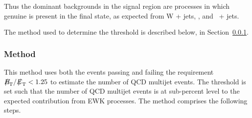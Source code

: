 Thus the dominant backgrounds in the signal region are processes in which genuine \met is present in the final state, as expected from W + jets, \ttbar, and \znunu\ + jets.

The method used to determine the \alphat threshold is described below, in Section~\ref{sec:qcd-method}.

\subsubsection{Method}
\label{sec:qcd-method}
This method uses both the events passing and failing the requirement $\mhtmet < 1.25$ to estimate the number of QCD multijet events. The \alphat threshold is set such that the number of QCD multijet events is at sub-percent level to the expected contribution from EWK processes. The method comprises the following steps.

